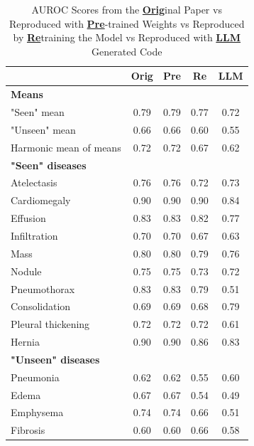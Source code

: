 \documentclass[letterpaper]{article} %
\begin{document}
\begin{table}[h!]
\centering
\begin{tabular}{|l|c|c|c|c|}
\hline
\textbf{} & \textbf{Orig} & \textbf{Pre} & \textbf{Re} & \textbf{LLM} \\
\hline
\textbf{Means}             &      &      &      &      \\
"Seen" mean                & 0.79 & 0.79 & 0.77 & 0.72 \\
"Unseen" mean              & 0.66 & 0.66 & 0.60 & 0.55 \\
Harmonic mean of means     & 0.72 & 0.72 & 0.67 & 0.62 \\
\textbf{"Seen" diseases}   &      &      &      &      \\
Atelectasis                & 0.76 & 0.76 & 0.72 & 0.73 \\
Cardiomegaly               & 0.90 & 0.90 & 0.90 & 0.84 \\
Effusion                   & 0.83 & 0.83 & 0.82 & 0.77 \\
Infiltration               & 0.70 & 0.70 & 0.67 & 0.63 \\
Mass                       & 0.80 & 0.80 & 0.79 & 0.76 \\
Nodule                     & 0.75 & 0.75 & 0.73 & 0.72 \\
Pneumothorax               & 0.83 & 0.83 & 0.79 & 0.51 \\
Consolidation              & 0.69 & 0.69 & 0.68 & 0.79 \\
Pleural thickening         & 0.72 & 0.72 & 0.72 & 0.61 \\
Hernia                     & 0.90 & 0.90 & 0.86 & 0.83 \\
\textbf{"Unseen" diseases} &      &      &      &      \\
Pneumonia                  & 0.62 & 0.62 & 0.55 & 0.60 \\
Edema                      & 0.67 & 0.67 & 0.54 & 0.49 \\
Emphysema                  & 0.74 & 0.74 & 0.66 & 0.51 \\
Fibrosis                   & 0.60 & 0.60 & 0.66 & 0.58 \\
\hline
\end{tabular}
\caption{AUROC Scores from the \textbf{\underline{Orig}}inal Paper vs Reproduced with \textbf{\underline{Pre}}-trained Weights vs Reproduced by \textbf{\underline{Re}}training the Model vs Reproduced with \textbf{\underline{LLM}} Generated Code}
\label{tab:results}
\end{table}
\end{document}
